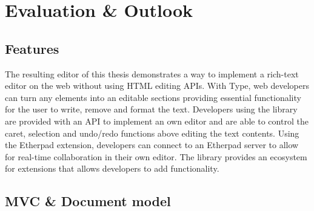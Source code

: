 
\chapter{Evaluation \& Outlook}
\label{ch:evaluation}

\section{Features}

The resulting editor of this thesis demonstrates a way to implement a rich-text editor on the web without using HTML editing APIs. With Type, web developers can turn any elements into an editable sections providing essential functionality for the user to write, remove and format the text. Developers using the library are provided with an API to implement an own editor and are able to control the caret, selection and undo/redo functions above editing the text contents. Using the Etherpad extension, developers can connect to an Etherpad server to allow for real-time collaboration in their own editor. The library provides an ecosystem for extensions that allows developers to add functionality.







 
 
\section{MVC \& Document model}

